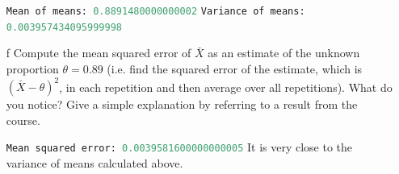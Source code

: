 \documentclass{article}
\newcommand{\1}{\mathbf{1}}
\begin{document}
\begin{itemize}
    \lstinline[language=Python]{Mean of means: 0.8891480000000002}\newline
    \lstinline[language=Python]{Variance of means: 0.003957434095999998}

    \item[f] Compute the mean squared error of $\bar{X}$ as an estimate of the unknown proportion $\theta=0.89$ (i.e. find the squared error of the estimate, which is $(\bar{X} - \theta)^2$, in each repetition and then average over all repetitions). What do you notice? Give a simple explanation by referring to a result from the course.
    
    \lstinline[language=Python]{Mean squared error: 0.0039581600000000005}
    It is very close to the variance of means calculated above. 
    
    \end{itemize}

\newpage
\end{document}
